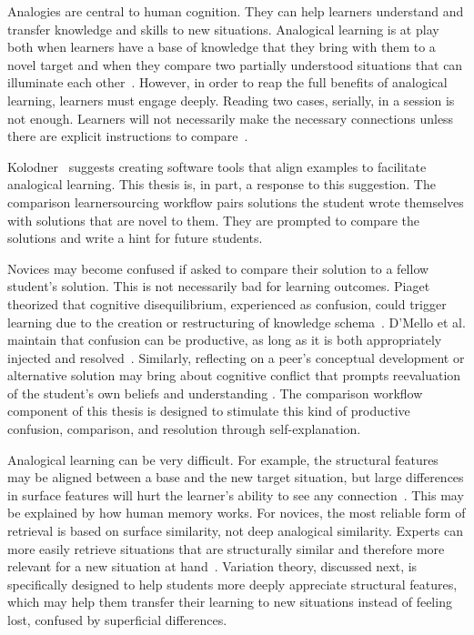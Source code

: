 Analogies are central to human cognition. They can help learners understand and transfer knowledge and skills to new situations. Analogical learning is at play both when learners have a base of knowledge that they bring with them to a novel target and when they compare two partially understood situations that can illuminate each other~\cite{kurtz01learning,loewenstein2003analogical}. However, in order to reap the full benefits of analogical learning, learners must engage deeply. Reading two cases, serially, in a session is not enough. Learners will not necessarily make the necessary connections unless there are explicit instructions to compare~\cite{loewenstein2003analogical,catrambone1989overcoming}. 

Kolodner~\cite{Kolodner} suggests creating software tools that align examples to facilitate analogical learning. This thesis is, in part, a response to this suggestion. The comparison learnersourcing workflow pairs solutions the student wrote themselves with solutions that are novel to them. They are prompted to compare the solutions and write a hint for future students.

Novices may become confused if asked to compare their solution to a fellow student's solution. This is not necessarily bad for learning outcomes. Piaget theorized that cognitive disequilibrium, experienced as confusion, could trigger learning due to the creation or restructuring of knowledge schema~\cite{disequilibrium}. D'Mello et al. maintain that confusion can be productive, as long as it is both appropriately injected and resolved~\cite{productiveconfusion}. Similarly, reflecting on a peer's conceptual development or alternative solution may bring about cognitive conflict that prompts reevaluation of the student's own beliefs and understanding \cite{kavanagh}. The comparison workflow component of this thesis is designed to stimulate this kind of productive confusion, comparison, and resolution through self-explanation. %

Analogical learning can be very difficult. For example, the structural features may be aligned between a base and the new target situation, but large differences in surface features will hurt the learner's ability to see any connection~\cite{Kurtz}. This may be explained by how human memory works. For novices, the most reliable form of retrieval is based on surface similarity, not deep analogical similarity. Experts can more easily retrieve situations that are structurally similar and therefore more relevant for a new situation at hand~\cite{Loewenstein}. Variation theory, discussed next, is specifically designed to help students more deeply appreciate structural features, which may help them transfer their learning to new situations instead of feeling lost, confused by superficial differences.

